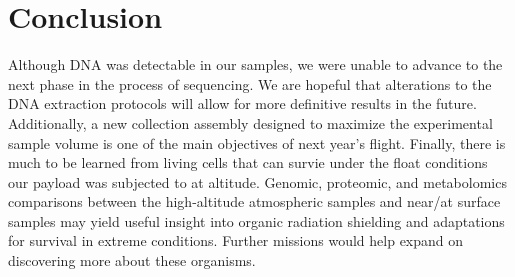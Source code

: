 \section{Conclusion}
\label{sec:Conclusion}
%
%
Although DNA was detectable in our samples, we were unable to advance to the next phase in the process of sequencing. We are hopeful that alterations to the DNA extraction protocols will allow for more definitive results in the future. Additionally, a new collection assembly designed to maximize the experimental sample volume is one of the main objectives of next year’s flight. Finally, there is much to be learned from living cells that can survie under the float conditions our payload was subjected to at altitude. Genomic, proteomic, and metabolomics comparisons between the high-altitude atmospheric samples and near/at surface samples may yield useful insight into organic radiation shielding and adaptations for survival in extreme conditions. Further missions would help expand on discovering more about these organisms.
%
